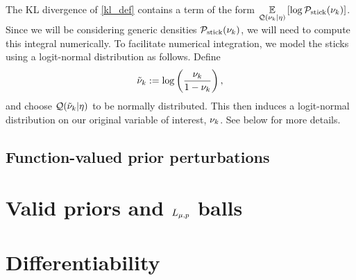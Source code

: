 The KL divergence of \eqref{kl_def} contains a term of the form $\underset{\mathcal{Q}(\nu_{k}
\vert \eta)}{\mathbb{E}}\left[\log \mathcal{P}_{\mathrm{stick}}(\nu_{k})\right]$.  Since we will be considering generic
densities $\mathcal{P}_{\mathrm{stick}}(\nu_{k})$, we will need to compute this integral numerically.
To facilitate numerical integration, we model the sticks using a logit-normal
distribution as follows.  Define
%
\begin{align*}
%
\lnuk := \log\left(\frac{\nuk}{1 - \nuk}\right),
%
\end{align*}
%
and choose $\mathcal{Q}(\tilde{\nu}_k \vert \eta)$ to be normally distributed.  This then
induces a logit-normal distribution on our original variable of interest,
$\nu_{k}$.  See  below for more details.




\hrulefill




\subsection{Function-valued prior perturbations}


\section{Valid priors and ${L_{\mu,p}}$ balls}


\section{Differentiability}

